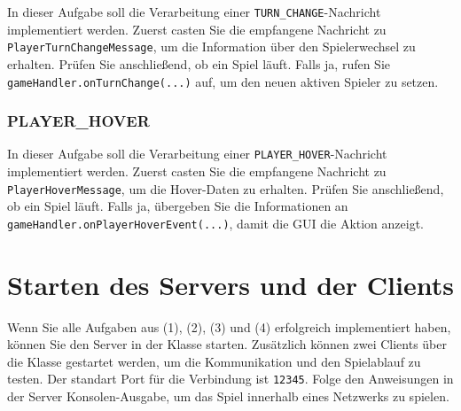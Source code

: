 \documentclass[12pt]{article}
\begin{document}
In dieser Aufgabe soll die Verarbeitung einer \texttt{TURN\_CHANGE}-Nachricht implementiert werden. 
Zuerst casten Sie die empfangene Nachricht zu \texttt{PlayerTurnChangeMessage}, 
um die Information über den Spielerwechsel zu erhalten. 
Prüfen Sie anschließend, ob ein Spiel läuft. 
Falls ja, rufen Sie \texttt{gameHandler.onTurnChange(...)} auf, 
um den neuen aktiven Spieler zu setzen.

\subsubsection*{PLAYER\_HOVER}

In dieser Aufgabe soll die Verarbeitung einer \texttt{PLAYER\_HOVER}-Nachricht implementiert werden. 
Zuerst casten Sie die empfangene Nachricht zu \texttt{PlayerHoverMessage}, 
um die Hover-Daten zu erhalten. 
Prüfen Sie anschließend, ob ein Spiel läuft. 
Falls ja, übergeben Sie die Informationen an \texttt{gameHandler.onPlayerHoverEvent(...)}, 
damit die GUI die Aktion anzeigt.

\section*{Starten des Servers und der Clients}

Wenn Sie alle Aufgaben aus (1), (2), (3) und (4) erfolgreich implementiert haben, 
können Sie den Server in der Klasse  starten.  
Zusätzlich können zwei Clients über die Klasse  gestartet werden, 
um die Kommunikation und den Spielablauf zu testen. Der standart Port für die Verbindung ist \texttt{12345}.
Folge den Anweisungen in der Server Konsolen-Ausgabe, um das Spiel innerhalb eines Netzwerks zu spielen.
\end{document}

